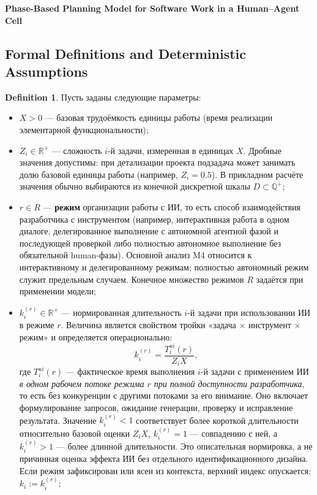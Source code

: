 \documentclass[12pt,a4paper]{article}
\theoremstyle{definition}
\newtheorem{definition}{Definition}
\begin{document}
  \begin{center}
    \Large\textbf{Phase-Based Planning Model for Software Work in a Human--Agent Cell}
  \end{center}
\fi

\subsection{Formal Definitions and Deterministic Assumptions}

\begin{definition}\label{def:params}
Пусть заданы следующие параметры:
\begin{itemize}
  \item $X > 0$ --- базовая трудоёмкость единицы работы (время реализации элементарной функциональности);
  \item $Z_i \in \mathbb{R}^{+}$ --- сложность $i$-й задачи, измеренная в единицах $X$. Дробные значения допустимы: при детализации проекта подзадача может занимать долю базовой единицы работы (например, $Z_i = 0.5$). В прикладном расчёте значения обычно выбираются из конечной дискретной шкалы $D\subset\mathbb{Q}^{+}$;
  \item $r \in R$ --- \textbf{режим} организации работы с ИИ, то есть способ взаимодействия разработчика с инструментом (например, интерактивная работа в одном диалоге, делегированное выполнение с автономной агентной фазой и последующей проверкой либо полностью автономное выполнение без обязательной human-фазы). Основной анализ M4 относится к интерактивному и делегированному режимам; полностью автономный режим служит предельным случаем. Конечное множество режимов $R$ задаётся при применении модели;
  \item $k_i^{(r)} \in \mathbb{R}^+$ --- нормированная длительность $i$-й задачи при использовании ИИ в режиме $r$. Величина является свойством тройки «задача $\times$ инструмент $\times$ режим» и определяется операционально:
  \[
    k_i^{(r)} = \frac{T_i^{ai}(r)}{Z_i X},
  \]
  где $T_i^{ai}(r)$ --- фактическое время выполнения $i$-й задачи с применением ИИ \emph{в одном рабочем потоке режима $r$ при полной доступности разработчика}, то есть без конкуренции с другими потоками за его внимание. Оно включает формулирование запросов, ожидание генерации, проверку и исправление результата. Значение $k_i^{(r)} < 1$ соответствует более короткой длительности относительно базовой оценки $Z_iX$, $k_i^{(r)} = 1$ --- совпадению с ней, а $k_i^{(r)} > 1$ --- более длинной длительности. Это описательная нормировка, а не причинная оценка эффекта ИИ без отдельного идентификационного дизайна. Если режим зафиксирован или ясен из контекста, верхний индекс опускается: $k_i := k_i^{(r)}$;

\end{itemize}
\end{definition}
\end{document}

